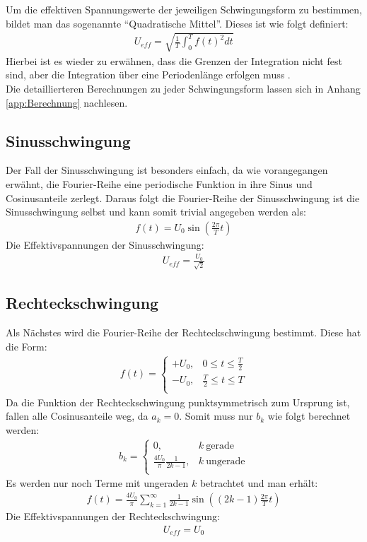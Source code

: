 Um die effektiven Spannungswerte der jeweiligen Schwingungsform zu bestimmen, bildet man das sogenannte \enquote{Quadratische Mittel}. Dieses ist wie folgt definiert:
\begin{gather}
    U_{eff} = \sqrt{\frac{1}{T}\int^T_0 f(t)^2 dt}
\end{gather}
Hierbei ist es wieder zu erwähnen, dass die Grenzen der Integration nicht fest sind, aber die Integration über eine Periodenlänge erfolgen muss \citep{messtechnik}.\\

Die detaillierteren Berechnungen zu jeder Schwingungsform lassen sich in Anhang \ref{app:Berechnung} nachlesen.

\subsection*{Sinusschwingung}
\label{sub:sinus}
Der Fall der Sinusschwingung ist besonders einfach, da wie vorangegangen erwähnt, die Fourier-Reihe eine periodische Funktion in ihre Sinus und Cosinusanteile zerlegt. Daraus folgt die Fourier-Reihe der Sinusschwingung ist die Sinusschwingung selbst und kann somit trivial angegeben werden als:
\begin{gather}
    \boxed{f(t) = U_0\sin(\frac{2\pi}{T} t)}
\end{gather}
Die Effektivspannungen der Sinusschwingung:
\begin{gather}
    \boxed{U_{eff}=\frac{U_0}{\sqrt{2}}}
\end{gather}

\subsection*{Rechteckschwingung}
\label{sub:square}
Als Nächstes wird die Fourier-Reihe der Rechteckschwingung bestimmt. Diese hat die Form:
\begin{gather}
    f(t) = 
    \begin{cases}
        +U_0, & 0 \leq t \leq \frac{T}{2} \\
        -U_0, & \frac{T}{2} \leq t \leq T \\
    \end{cases}
\end{gather}
Da die Funktion der Rechteckschwingung punktsymmetrisch zum Ursprung ist, fallen alle Cosinusanteile weg, da $a_k = 0$. Somit muss nur $b_k$ wie folgt berechnet werden:
\begin{gather}
    b_k =
    \begin{cases}
        0, & k~\text{gerade}\\
        \frac{4U_0}{\pi}\frac{1}{2k-1}, & k~\text{ungerade}\\
    \end{cases}
\end{gather} 
Es werden nur noch Terme mit ungeraden $k$ betrachtet und man erhält:
\begin{gather}
    \boxed{f(t) = \frac{4U_0}{\pi} \sum^{\infty}_{k=1} \frac{1}{2k-1} \sin((2k-1)\frac{2\pi}{T}t)}
\end{gather}
Die Effektivspannungen der Rechteckschwingung:
\begin{gather}
    \boxed{U_{eff} = U_0}
\end{gather}
